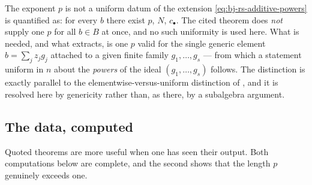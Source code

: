 \begin{warning}{The exponent $p$ is not a uniform datum of the extension}
\label{warn:ch44-p-not-uniform}
\eqref{eq:bj-rs-additive-powers} is quantified as: for every $b$ there
exist $p$, $N$, $c_\bullet$.  The cited theorem does \emph{not}
supply one $p$ for all $b\in B$ at once, and no such uniformity is
used here.  What is needed, and what
 extracts, is one $p$ valid for the
single generic element $b=\sum_jz_jg_j$ attached to a given finite family
$g_1,\ldots,g_s$ --- from which a statement uniform in $n$ about the
\emph{powers} of the ideal $(g_1,\ldots,g_s)$ follows.  The distinction is
exactly parallel to the elementwise-versus-uniform distinction of
, and it is resolved here by genericity rather
than, as there, by a subalgebra argument.
\end{warning}

\subsection{The data, computed}
\label{sec:ch44-rs-computed}

Quoted theorems are more useful when one has seen their output.  Both
computations below are complete, and the second shows that the length $p$
genuinely exceeds one.


